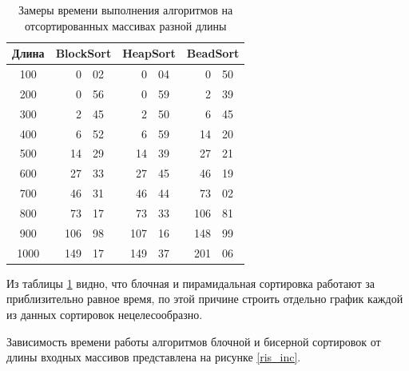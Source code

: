 \documentclass[a4paper,14pt, unknownkeysallowed]{extreport}
\begin{document}
\begin{table}[h!]
    \captionsetup{justification=raggedright,singlelinecheck=off}
    \caption{Замеры времени выполнения алгоритмов на отсортированных массивах разной длины}
    \label{table:t_inc}
	\begin{center}
        \begin{tabular}{| c | r@{.}l | r@{.}l | r@{.}l |}
        \hline
        Длина &
        \multicolumn{2}{c|}{BlockSort} & 
        \multicolumn{2}{c|}{HeapSort} &
        \multicolumn{2}{c|}{BeadSort}\\ \hline
        
        100 & 0&02 & 0&04 & 0&50 \\ \hline 
				
        200 & 0&56 & 0&59 & 2&39 \\ \hline 
		
        300 & 2&45 & 2&50 & 6&45 \\ \hline 
				
        400 & 6&52 & 6&59 & 14&20 \\ \hline 
				
        500 & 14&29 & 14&39 & 27&21 \\ \hline
        
        600 & 27&33 & 27&45 & 46&19 \\ \hline 
				
        700 & 46&31 & 46&44 & 73&02 \\ \hline 
				
        800 & 73&17 & 73&33 & 106&81 \\ \hline 
				
        900 & 106&98 & 107&16 & 148&99 \\ \hline 
				
        1000 & 149&17 & 149&37 & 201&06 \\ \hline
        
        \end{tabular}
    \end{center}
\end{table}

Из таблицы \ref{table:t_inc} видно, что блочная и пирамидальная сортировка работают за приблизительно равное время, по этой причине строить отдельно график каждой из данных сортировок нецелесообразно.

Зависимость времени работы алгоритмов блочной и бисерной сортировок от длины входных массивов представлена на рисунке \ref{ris_inc}.
\end{document}
